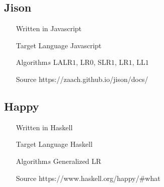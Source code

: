 \subsection{Jison}
\begin{itemize}
    \item[Written in] Javascript
    \item[Target Language] Javascript
    \item[Algorithm\(s\)]   LALR\(1\), LR\(0\), SLR\(1\), LR\(1\), LL\(1\)
    \item[Source]           https://zaach.github.io/jison/docs/
\end{itemize}

\subsection{Happy}
\begin{itemize}
    \item[Written in] Haskell
    \item[Target Language] Haskell
    \item[Algorithm\(s\)]   Generalized LR
    \item[Source]           https://www.haskell.org/happy/\#what
\end{itemize}
